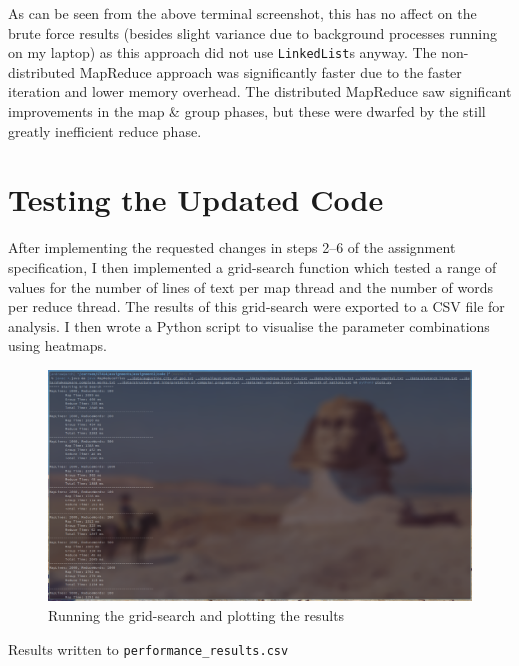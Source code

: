 \documentclass[a4paper]{article}
\begin{document}
As can be seen from the above terminal screenshot, this has no affect on the brute force results (besides slight variance due to background processes running on my laptop) as this approach did not use \texttt{LinkedList}s anyway.
The non-distributed MapReduce approach was significantly faster due to the faster iteration and lower memory overhead.
The distributed MapReduce saw significant improvements in the map \& group phases, but these were dwarfed by the still greatly inefficient reduce phase.

\section{Testing the Updated Code}
After implementing the requested changes in steps 2--6 of the assignment specification, I then implemented a grid-search function which tested a range of values for the number of lines of text per map thread and the number of words per reduce thread.
The results of this grid-search were exported to a CSV file for analysis.
I then wrote a Python script to visualise the parameter combinations using heatmaps.

\begin{figure}[H]
    \centering
    \includegraphics[width=\textwidth]{./images/gridsearch.png}
    \caption{Running the grid-search and plotting the results}
\end{figure}

\begin{table}[H]
\centering
{}
\caption{Results written to \texttt{performance\_results.csv}}
\end{table}
\end{document}
